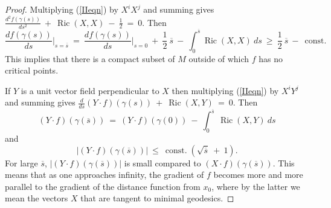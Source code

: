 \documentclass[12pt]{amsart}
\newcommand{\const}{\operatorname{const.}}
\newcommand{\Ric}{\operatorname{Ric}}
\numberwithin{equation}{section}
\theoremstyle{plain}
\theoremstyle{definition}
\theoremstyle{remark}
\begin{document}
\begin{proof}
Multiplying (\ref{IIeqn}) by $X^i X^j$ and summing gives
$\frac{d^2f(\gamma(s))}{ds^2} \: + \: \Ric(X, X) \: - \: \frac{1}{2}
\: =\: 0$. Then 
\begin{equation}
\frac{d f(\gamma(s))}{ds} \Big|_{s = \overline{s}} \: = \:
\frac{d f(\gamma(s))}{ds} \Big|_{s = 0} \: + \: 
\frac{1}{2} \: \overline{s} \: - \: \int_0^{\overline{s}} \Ric(X, X) \: ds
\: \ge \: \frac{1}{2} \: \overline{s} \: - \: \const
\end{equation}
This implies that there is a compact subset of $M$ outside of which
$f$ has no critical points.

If $Y$ is a unit vector field perpendicular to $X$ then
multiplying (\ref{IIeqn}) by $X^i Y^j$ and summing gives
$\frac{d}{ds} (Y \cdot f)(\gamma(s)) \: + \: \Ric(X, Y)
\: =\: 0$. Then 
\begin{equation}
(Y \cdot f)(\gamma(\overline{s})) \: = \: 
(Y \cdot f)(\gamma(0)) \: - \: 
\int_0^{\overline{s}} \: \Ric(X, Y) \: ds
\end{equation}
and 
\begin{equation}
|(Y \cdot f)(\gamma(\overline{s}))| \: \le \:
\const (\sqrt{\overline{s}} \: +\: 1).
\end{equation}
For large $\overline{s}$, $|(Y \cdot f)(\gamma(\overline{s}))|$
is small compared to $(X \cdot f)(\gamma(\overline{s}))$. This
means that as one approaches infinity, the gradient of $f$ becomes
more and more parallel to the gradient of the distance function
from $x_0$, where by the latter we mean the vectors $X$ that are
tangent to minimal geodesics.


\end{proof}
\end{document}
